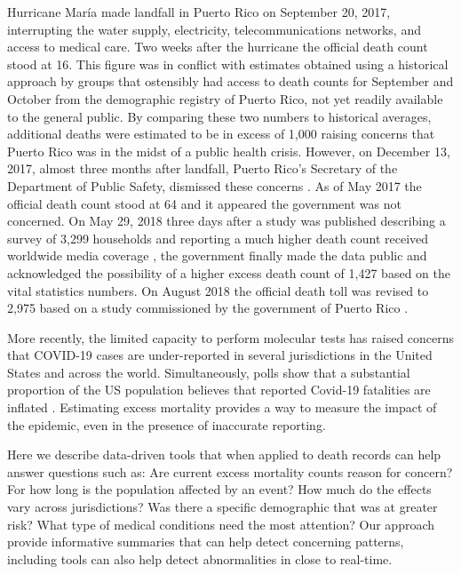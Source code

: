 \documentclass[11pt]{article}
\begin{document}
Hurricane Mar\'ia made landfall in Puerto Rico on September 20, 2017, interrupting the water supply, electricity, telecommunications networks, and access to medical care\cite{updates2018puerto, rogers2017puerto}. Two weeks after the hurricane the official death count stood at 16\cite{hoyos2018puerto}. This figure was in conflict with estimates obtained using a historical approach by groups that ostensibly had access to death counts for September and October from the demographic registry of Puerto Rico, not yet readily available to the general public. By comparing these two numbers to historical averages, additional deaths were estimated to be in excess of 1,000 \cite{santos2018use, robles2017official, rivera2018estimating, pascual2017nearly} raising concerns that Puerto Rico was in the midst of a public health crisis. However, on December 13, 2017, almost three months after landfall, Puerto Rico’s Secretary of the Department of Public Safety, dismissed these concerns \cite{robles2017official}. As of May 2017 the official death count stood at 64 \cite{hoyos2018puerto} and it appeared the government was not concerned. On May 29, 2018 three days after a study was published describing a survey of 3,299 households and reporting a much higher death count received worldwide media coverage \cite{kishore2018mortality}, the government finally made the data public and acknowledged the possibility of a higher excess death count of 1,427\cite{cheslow2018puerto} based on the vital statistics numbers. On August 2018 the official death toll was revised to 2,975 based on a study commissioned by the government of Puerto Rico \cite{santos2018differential}.

More recently, the limited capacity to perform molecular tests has raised concerns that COVID-19 cases are under-reported in several jurisdictions in the United States and across the world. Simultaneously, polls show that a substantial proportion of the US population believes that reported Covid-19 fatalities are inflated \cite{talev2020}. Estimating excess mortality provides a way to measure the impact of the epidemic, even in the presence of inaccurate reporting.

Here we describe data-driven tools that when applied to death records can help answer questions such as: Are current excess mortality counts reason for concern? For how long is the population affected by an event?  How much do the effects vary across jurisdictions?  Was there a specific demographic that was at greater risk? What type of medical conditions need the most attention? Our approach provide informative summaries that can help detect concerning patterns, including tools can also help detect abnormalities in close to real-time. 
\end{document}
